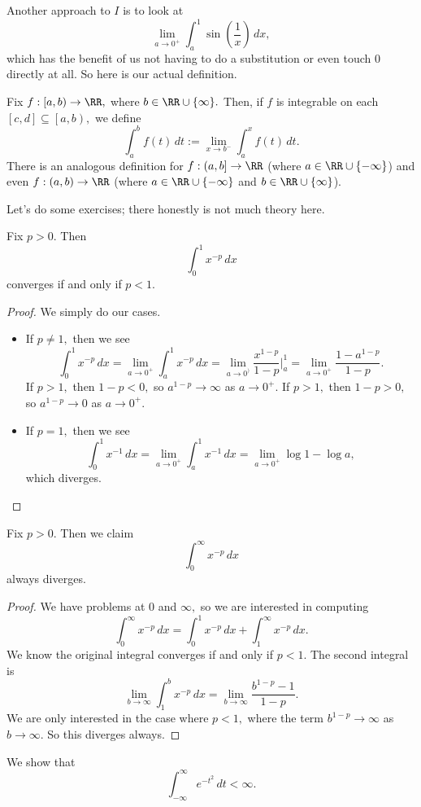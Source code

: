 \documentclass[../notes.tex]{subfiles}
\begin{document}
Another approach to $I$ is to look at
\[\lim_{a\to0^+}\int_a^1\sin\left(\frac1x\right)\,dx,\]
which has the benefit of us not having to do a substitution or even touch $0$ directly at all. So here is our actual definition.
\begin{definition}
	Fix $f:\left[a,b\right)\to\RR,$ where $b\in\RR\cup\{\infty\}.$ Then, if $f$ is integrable on each $[c,d]\subseteq\left[a,b\right),$ we define
	\[\int_a^bf(t)\,dt:=\lim_{x\to b^-}\int_a^xf(t)\,dt.\]
	There is an analogous definition for $f:\left(a,b\right]\to\RR$ (where $a\in\RR\cup\{-\infty\}$) and even $f:(a,b)\to\RR$ (where $a\in\RR\cup\{-\infty\}$ and $b\in\RR\cup\{\infty\}$).
\end{definition}
Let's do some exercises; there honestly is not much theory here.
\begin{exe}[Ross 36.3]
	Fix $p>0.$ Then
	\[\int_0^1x^{-p}\,dx\]
	converges if and only if $p<1.$
\end{exe}
\begin{proof}
	We simply do our cases.
	\begin{itemize}
		\item If $p\ne1,$ then we see
		\[\int_0^1x^{-p}\,dx=\lim_{a\to0^+}\int_a^1x^{-p}\,dx=\lim_{a\to0^)}\frac{x^{1-p}}{1-p}\bigg|_a^1=\lim_{a\to0^+}\frac{1-a^{1-p}}{1-p}.\]
		If $p>1,$ then $1-p<0,$ so $a^{1-p}\to\infty$ as $a\to0^+.$ If $p>1,$ then $1-p>0,$ so $a^{1-p}\to0$ as $a\to0^+.$
		\item If $p=1,$ then we see
		\[\int_0^1x^{-1}\,dx=\lim_{a\to0^+}\int_a^1x^{-1}\,dx=\lim_{a\to0^+}\log1-\log a,\]
		which diverges.
		\qedhere
	\end{itemize}
\end{proof}
\begin{exe}
	Fix $p>0.$ Then we claim
	\[\int_0^\infty x^{-p}\,dx\]
	always diverges.
\end{exe}
\begin{proof}
	We have problems at $0$ and $\infty,$ so we are interested in computing
	\[\int_0^\infty x^{-p}\,dx=\int_0^1x^{-p}\,dx+\int_1^\infty x^{-p}\,dx.\]
	We know the original integral converges if and only if $p<1.$ The second integral is
	\[\lim_{b\to\infty}\int_1^b x^{-p}\,dx=\lim_{b\to\infty}\frac{b^{1-p}-1}{1-p}.\]
	We are only interested in the case where $p<1,$ where the term $b^{1-p}\to\infty$ as $b\to\infty.$ So this diverges always.
\end{proof}
\begin{exe}
	We show that
	\[\int_{-\infty}^\infty e^{-t^2}\,dt<\infty.\]
\end{exe}
\end{document}
